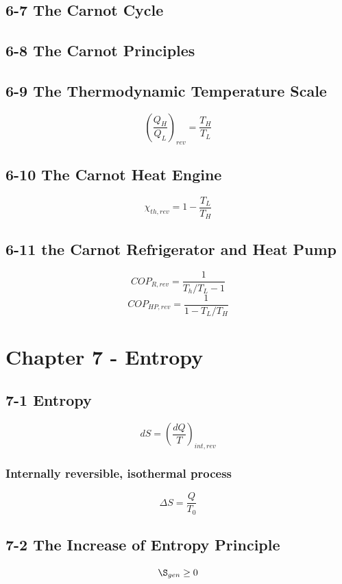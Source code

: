 \documentclass[10pt,landscape]{article}
\begin{document}
\begin{multicols}{3}
\subsection{6-7 The Carnot Cycle}
\subsection{6-8 The Carnot Principles}
\subsection{6-9 The Thermodynamic Temperature Scale}
\begin{equation}
    (\frac{Q_H}{Q_L})_{rev}=\frac{T_H}{T_L}
\end{equation}
\subsection{6-10 The Carnot Heat Engine}
\begin{equation}
    \chi_{th,rev}=1-\frac{T_L}{T_H}
\end{equation}
\subsection{6-11 the Carnot Refrigerator and Heat Pump}
\begin{equation}
    COP_{R,rev}=\frac{1}{T_h/T_L-1}
\end{equation}
\begin{equation}
    COP_{HP,rev}=\frac{1}{1-T_L/T_H}
\end{equation}

\section{Chapter 7 - Entropy}
\subsection{7-1 Entropy}
\begin{equation}
    dS=(\frac{dQ}{T})_{int,rev}
\end{equation}
\subsubsection{Internally reversible, isothermal process}
\begin{equation}
    \Delta S = \frac{Q}{T_0}
\end{equation}
\subsection{7-2 The Increase of Entropy Principle}
\begin{equation}
\S_{gen}\geq0    
\end{equation}

\end{multicols}
\end{document}
